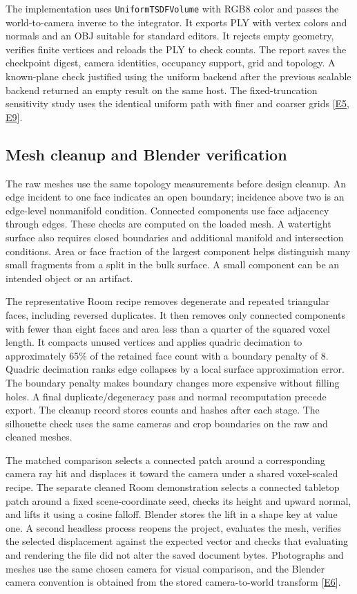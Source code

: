 The implementation uses \texttt{UniformTSDFVolume} with RGB8 color and passes the world-to-camera inverse to the integrator. It exports PLY with vertex colors and normals and an OBJ suitable for standard editors. It rejects empty geometry, verifies finite vertices and reloads the PLY to check counts. The report saves the checkpoint digest, camera identities, occupancy support, grid and topology. A known-plane check justified using the uniform backend after the previous scalable backend returned an empty result on the same host. The fixed-truncation sensitivity study uses the identical uniform path with finer and coarser grids [\hyperlink{evE5}{E5}, \hyperlink{evE9}{E9}].

\subsection{Mesh cleanup and Blender verification}
The raw meshes use the same topology measurements before design cleanup. An edge incident to one face indicates an open boundary; incidence above two is an edge-level nonmanifold condition. Connected components use face adjacency through edges. These checks are computed on the loaded mesh. A watertight surface also requires closed boundaries and additional manifold and intersection conditions. Area or face fraction of the largest component helps distinguish many small fragments from a split in the bulk surface. A small component can be an intended object or an artifact.

The representative Room recipe removes degenerate and repeated triangular faces, including reversed duplicates. It then removes only connected components with fewer than eight faces and area less than a quarter of the squared voxel length. It compacts unused vertices and applies quadric decimation to approximately 65\% of the retained face count with a boundary penalty of 8. Quadric decimation ranks edge collapses by a local surface approximation error. The boundary penalty makes boundary changes more expensive without filling holes. A final duplicate/degeneracy pass and normal recomputation precede export. The cleanup record stores counts and hashes after each stage. The silhouette check uses the same cameras and crop boundaries on the raw and cleaned meshes.

The matched comparison selects a connected patch around a corresponding camera ray hit and displaces it toward the camera under a shared voxel-scaled recipe. The separate cleaned Room demonstration selects a connected tabletop patch around a fixed scene-coordinate seed, checks its height and upward normal, and lifts it using a cosine falloff. Blender stores the lift in a shape key at value one. A second headless process reopens the project, evaluates the mesh, verifies the selected displacement against the expected vector and checks that evaluating and rendering the file did not alter the saved document bytes. Photographs and meshes use the same chosen camera for visual comparison, and the Blender camera convention is obtained from the stored camera-to-world transform [\hyperlink{evE6}{E6}].

